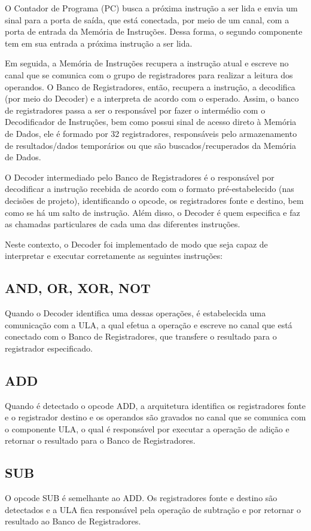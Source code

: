 \documentclass[12pt]{article}
\begin{document}
O Contador de Programa (PC) busca a próxima instrução a ser lida e envia um sinal para a porta de saída, que está conectada, por meio de um canal, com a porta de entrada da Memória de Instruções. Dessa forma, o segundo componente tem em sua entrada a próxima instrução a ser lida.

Em seguida, a Memória de Instruções recupera a instrução atual e escreve no canal que se comunica com o grupo de registradores para realizar a leitura dos operandos. O Banco de Registradores, então, recupera a instrução, a decodifica (por meio do Decoder) e a interpreta de acordo com o esperado. Assim, o banco de registradores passa a ser o responsável por fazer o intermédio com o Decodificador de Instruções, bem como possui sinal de acesso direto à Memória de Dados, ele é formado por 32 registradores, responsáveis pelo armazenamento de resultados/dados temporários ou que são buscados/recuperados da Memória de Dados.

O Decoder intermediado pelo Banco de Registradores é o responsável por decodificar a instrução recebida de acordo com o formato pré-estabelecido (nas decisões de projeto), identificando o opcode, os registradores fonte e destino, bem como se há um salto de instrução. Além disso, o Decoder é quem especifica e faz as chamadas particulares de cada uma das diferentes instruções.

Neste contexto, o Decoder foi implementado de modo que seja capaz de interpretar e executar corretamente as seguintes instruções:

\subsection{AND, OR, XOR, NOT}
Quando o Decoder identifica uma dessas operações, é estabelecida uma comunicação com a ULA, a qual efetua a operação e escreve no canal que está conectado com o Banco de Registradores, que transfere o resultado para o registrador especificado.

\subsection{ADD}
Quando é detectado o opcode ADD, a arquitetura identifica os registradores fonte e o registrador destino e os operandos são gravados no canal que se comunica com o componente ULA, o qual é responsável por executar a operação de adição e retornar o resultado para o Banco de Registradores.

\subsection{SUB}
O opcode SUB é semelhante ao ADD. Os registradores fonte e destino são detectados e a ULA fica responsável pela operação de subtração e por retornar o resultado ao Banco de Registradores.
\end{document}
